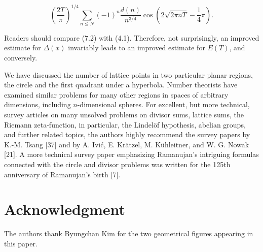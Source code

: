 \documentclass[10pt]{article}
\theoremstyle{plain}
\begin{document}
\begin{equation*}
\left(\frac{2 T}{\pi}\right)^{1 / 4} \sum_{n \leq N}(-1)^{n} \frac{d(n)}{n^{3 / 4}} \cos \left(2 \sqrt{2 \pi n T}-\frac{1}{4} \pi\right) . \tag{7.2}
\end{equation*}


Readers should compare (7.2) with (4.1). Therefore, not surprisingly, an improved estimate for $\Delta(x)$ invariably leads to an improved estimate for $E(T)$, and conversely.

We have discussed the number of lattice points in two particular planar regions, the circle and the first quadrant under a hyperbola. Number theorists have examined similar problems for many other regions in spaces of arbitrary dimensions, including $n$-dimensional spheres. For excellent, but more technical, survey articles on many unsolved problems on divisor sums, lattice sums, the Riemann zeta-function, in particular, the Lindelöf hypothesis, abelian groups, and further related topics, the authors highly recommend the survey papers by K.-M. Tsang [37] and by A. Ivić, E. Krätzel, M. Kühleitner, and W. G. Nowak [21]. A more technical survey paper emphasizing Ramanujan's intriguing formulas connected with the circle and divisor problems was written for the 125th anniversary of Ramanujan's birth [7].

\section*{Acknowledgment}
The authors thank Byungchan Kim for the two geometrical figures appearing in this paper.
\end{document}
